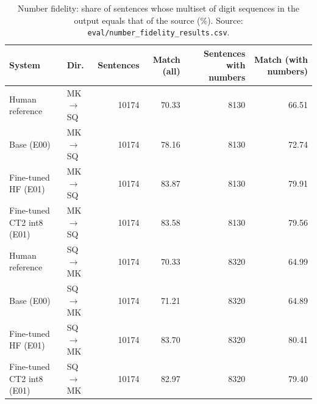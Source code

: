 \begin{table}[t]
\centering
\small
\begin{tabular}{llrrrr}
\toprule
System & Dir. & Sentences & Match (all) & Sentences with numbers & Match (with numbers) \\
\midrule
Human reference & MK$\rightarrow$SQ & 10174 & 70.33 & 8130 & 66.51 \\
Base (E00) & MK$\rightarrow$SQ & 10174 & 78.16 & 8130 & 72.74 \\
Fine-tuned HF (E01) & MK$\rightarrow$SQ & 10174 & 83.87 & 8130 & 79.91 \\
Fine-tuned CT2 int8 (E01) & MK$\rightarrow$SQ & 10174 & 83.58 & 8130 & 79.56 \\
Human reference & SQ$\rightarrow$MK & 10174 & 70.33 & 8320 & 64.99 \\
Base (E00) & SQ$\rightarrow$MK & 10174 & 71.21 & 8320 & 64.89 \\
Fine-tuned HF (E01) & SQ$\rightarrow$MK & 10174 & 83.70 & 8320 & 80.41 \\
Fine-tuned CT2 int8 (E01) & SQ$\rightarrow$MK & 10174 & 82.97 & 8320 & 79.40 \\
\bottomrule
\end{tabular}
\caption{Number fidelity: share of sentences whose multiset of digit sequences in the output equals that of the source (\%). Source: \texttt{eval/number\_fidelity\_results.csv}.}
\label{tab:e01-number_fidelity}
\end{table}
